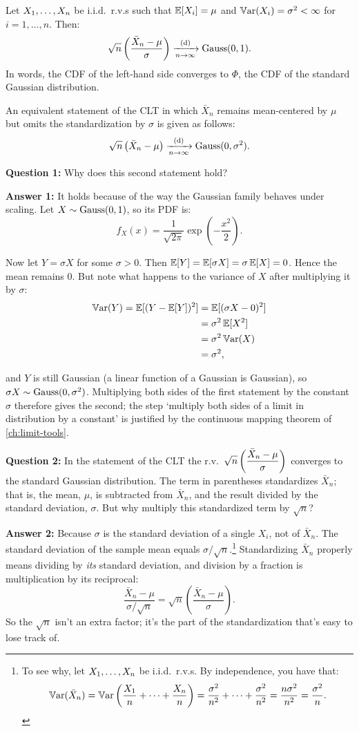 \begin{theorem}
\label{thm:clt}
Let $X_1, \ldots, X_n$ be i.i.d.\ r.v.s such that $\operatorname*{\mathbb{E}}[X_i] = \mu$ and $\operatorname*{\mathbb{V}\text{ar}}(X_i) = \sigma^2 < \infty$ for $i = 1, \ldots, n$.
Then:
\[
\sqrt{n} \left( \frac{\bar{X}_n - \mu}{\sigma} \right) \xrightarrow [n \to \infty ]{\text{(d)}} \text{Gauss}(0, 1).
\]
In words, the CDF of the left-hand side converges to $\Phi$, the CDF of the standard Gaussian distribution.
\end{theorem}

An equivalent statement of the CLT in which $\bar{X}_n$ remains mean-centered by $\mu$ but omits the standardization by $\sigma$ is given as follows:
\[
\sqrt{n} \left( \bar{X}_n - \mu \right) \xrightarrow [n \to \infty ]{\text{(d)}} \text{Gauss}(0, \sigma^2).
\]

\textbf{Question 1:} Why does this second statement hold?

\textbf{Answer 1:} It holds because of the way the Gaussian family behaves under scaling.
Let $X \sim \text{Gauss}(0, 1)$, so its PDF is:
\[
f_X(x) = \frac{1}{\sqrt{2 \pi} } \exp \left( - \frac{x^2}{2} \right).
\]

Now let $Y = \sigma X$ for some $\sigma > 0$.
Then $\operatorname*{\mathbb{E}}[Y] = \operatorname*{\mathbb{E}}[\sigma X] = \sigma \operatorname*{\mathbb{E}}[X] = 0$.
Hence the mean remains 0.
But note what happens to the variance of $X$ after multiplying it by $\sigma$:
\begin{align*}
\operatorname*{\mathbb{V}\text{ar}}(Y) = \operatorname*{\mathbb{E}}[(Y - \operatorname*{\mathbb{E}}[Y])^2] &= \operatorname*{\mathbb{E}}[(\sigma X - 0)^2] \\
	&= \sigma^2 \operatorname*{\mathbb{E}}[X^2] \\
	&= \sigma^2 \operatorname*{\mathbb{V}\text{ar}}(X) \\
	&= \sigma^2,
\end{align*}

and $Y$ is still Gaussian (a linear function of a Gaussian is Gaussian), so $\sigma X \sim \text{Gauss}(0, \sigma^2)$.
Multiplying both sides of the first statement by the constant $\sigma$ therefore gives the second; the step `multiply both sides of a limit in distribution by a constant' is justified by the continuous mapping theorem of \cref{ch:limit-tools}.

\textbf{Question 2:} In the statement of the CLT the r.v.\ $\displaystyle \sqrt{n} \left( \frac{\bar{X}_n - \mu}{\sigma} \right)$ converges to the standard Gaussian distribution.
The term in parentheses standardizes $\bar{X}_n$;
that is, the mean, $\mu$, is subtracted from $\bar{X}_n$, and the result divided by the standard deviation, $\sigma$.
But why multiply this standardized term by $\sqrt{n}$?

\textbf{Answer 2:} Because $\sigma$ is the standard deviation of a single $X_i$, not of $\bar{X}_n$.
The standard deviation of the sample mean equals $\sigma/\sqrt{n}$.\footnote{To see why, let $X_1, \ldots, X_n$ be i.i.d.\ r.v.s.
By independence, you have that:
\[
\operatorname*{\mathbb{V}\text{ar}}(\bar{X}_n) = \operatorname*{\mathbb{V}\text{ar}}\left( \frac{X_1}{n} + \cdots + \frac{X_n}{n} \right) = \frac{\sigma^2}{n^2} + \cdots + \frac{\sigma^2}{n^2} = \frac{n \sigma^2}{n^2} = \frac{\sigma^2}{n}.
\]}
Standardizing $\bar{X}_n$ properly means dividing by \textit{its} standard deviation, and division by a fraction is multiplication by its reciprocal:
\[
\frac{\bar{X}_n - \mu}{\sigma/\sqrt{n}} = \sqrt{n} \left( \frac{\bar{X}_n - \mu}{\sigma} \right).
\]
So the $\sqrt{n}$ isn't an extra factor; it's the part of the standardization that's easy to lose track of.

